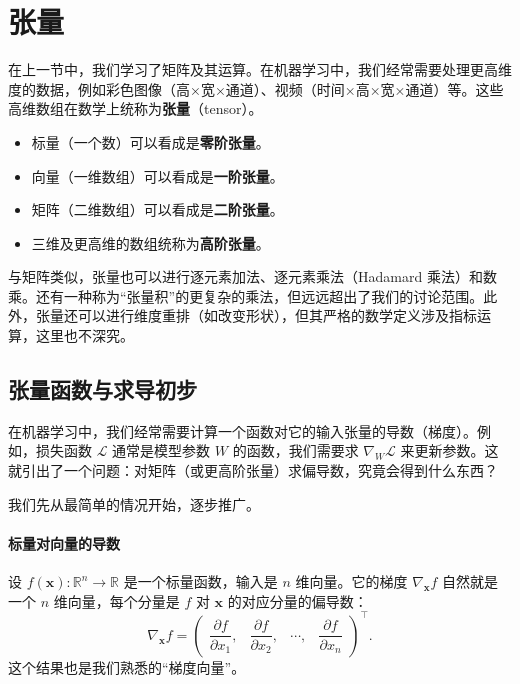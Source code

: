 \section{张量}

在上一节中，我们学习了矩阵及其运算。在机器学习中，我们经常需要处理更高维度的数据，例如彩色图像（高×宽×通道）、视频（时间×高×宽×通道）等。这些高维数组在数学上统称为\textbf{张量}（tensor）。

\begin{itemize}
    \item 标量（一个数）可以看成是\textbf{零阶张量}。
    \item 向量（一维数组）可以看成是\textbf{一阶张量}。
    \item 矩阵（二维数组）可以看成是\textbf{二阶张量}。
    \item 三维及更高维的数组统称为\textbf{高阶张量}。
\end{itemize}

与矩阵类似，张量也可以进行逐元素加法、逐元素乘法（Hadamard 乘法）和数乘。还有一种称为“张量积”的更复杂的乘法，但远远超出了我们的讨论范围。此外，张量还可以进行维度重排（如改变形状），但其严格的数学定义涉及指标运算，这里也不深究。

\subsection{张量函数与求导初步}

在机器学习中，我们经常需要计算一个函数对它的输入张量的导数（梯度）。例如，损失函数 $\mathcal{L}$ 通常是模型参数 $W$ 的函数，我们需要求 $\nabla_W \mathcal{L}$ 来更新参数。这就引出了一个问题：对矩阵（或更高阶张量）求偏导数，究竟会得到什么东西？

我们先从最简单的情况开始，逐步推广。

\paragraph{标量对向量的导数}

设 $f(\mathbf{x}) : \mathbb{R}^n \to \mathbb{R}$ 是一个标量函数，输入是 $n$ 维向量。它的梯度 $\nabla_{\mathbf{x}} f$ 自然就是一个 $n$ 维向量，每个分量是 $f$ 对 $\mathbf{x}$ 的对应分量的偏导数：
\begin{equation}
    \nabla_{\mathbf{x}} f =
    \begin{pmatrix}
        \dfrac{\partial f}{\partial x_1}, & \dfrac{\partial f}{\partial x_2}, & \cdots, & \dfrac{\partial f}{\partial x_n}
    \end{pmatrix}^\top .
\end{equation}
这个结果也是我们熟悉的“梯度向量”。

